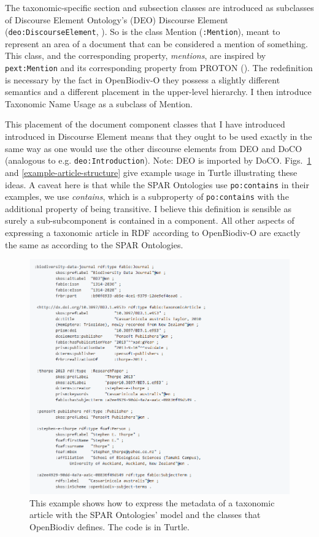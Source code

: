 The taxonomic-specific section and subsection classes are introduced as subclasses of Discourse Element Ontology's (DEO) Discourse Element ({\tt deo:DiscourseElement},  \cite{constantin_document_2016}). So is the class Mention ({\tt :Mention}), meant to represent an area of a document that can be considered a mention of something. This class, and the corresponding property, \emph{mentions}, are inspired by {\tt pext:Mention} and its corresponding property from PROTON (\cite{damova_mapping_2010}). The redefinition is necessary by the fact in OpenBiodiv-O they possess a slightly different semantics and a different placement in the upper-level hierarchy. I then introduce Taxonomic Name Usage as a subclass of Mention.

This placement of the document component classes that I have introduced introduced in Discourse Element means that they ought to be used exactly in the same way as one would use the other discourse elements from DEO and DoCO (analogous to e.g. {\tt deo:Introduction}). Note: DEO is imported by DoCO. Figs.~\ref{example-article-metadata} and \ref{example-article-structure} give example usage in Turtle illustrating these ideas. A caveat here is that while the SPAR Ontologies use {\tt po:contains} in their examples, we use \emph{contains}, which is a subproperty of {\tt po:contains} with the additional property of being transitive. I believe this definition is sensible as surely a sub-subcomponent is contained in a component. All other aspects of expressing a taxonomic article in RDF according to OpenBiodiv-O are exactly the same as according to the SPAR Ontologies.

\begin{figure}[h!]
	\centering
	\includegraphics[width=\textwidth]{Figures/example-article-metadata}
	\decoRule
  \caption[Example article metadata.]{This example shows how to express the metadata of a taxonomic article with the SPAR Ontologies' model and the classes that OpenBiodiv defines. The code is in Turtle.}
  \label{example-article-metadata}
\end{figure}

